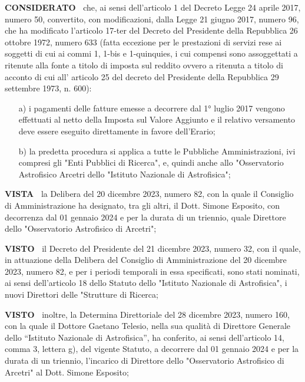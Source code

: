 \documentclass[a4paper,12pt]{letter}
\begin{document}
\textbf{CONSIDERATO~} che, ai sensi dell’articolo 1 del
Decreto Legge 24 aprile 2017, numero 50, convertito, con modificazioni,
dalla Legge 21 giugno 2017, numero 96, che ha modificato l’articolo
17-ter del Decreto del Presidente della Repubblica 26 ottobre 1972, numero
633 (fatta eccezione per le prestazioni di servizi rese ai soggetti di
cui ai commi 1, 1-bis e 1-quinquies, i cui compensi sono assoggettati a
ritenute alla fonte a titolo di imposta sul reddito ovvero a ritenuta a
titolo di acconto di cui all' articolo 25 del decreto del Presidente della
Repubblica 29 settembre 1973, n. 600):

\begin{enumerate}

\item[a)] i pagamenti delle fatture
emesse a decorrere dal 1° luglio 2017 vengono effettuati al netto della
Imposta sul Valore Aggiunto e il relativo versamento deve essere eseguito
direttamente in favore dell’Erario;

\item[b)] la predetta procedura si
applica a tutte le Pubbliche Amministrazioni, ivi compresi gli "Enti
Pubblici di Ricerca", e, quindi anche allo "Osservatorio Astrofisico
Arcetri dello "Istituto Nazionale di Astrofisica";
\end{enumerate}

\textbf{VISTA~}	la Delibera del 20 dicembre 2023, numero 82, con la
quale il Consiglio di Amministrazione ha designato, tra gli altri,
il Dott. Simone Esposito, con decorrenza dal 01 gennaio 2024 e per la
durata di un triennio, quale Direttore dello "Osservatorio Astrofisico
di Arcetri";

\textbf{VISTO~}	il Decreto del Presidente del 21 dicembre 2023,
numero 32, con il quale, in attuazione della Delibera del Consiglio di
Amministrazione del 20 dicembre 2023, numero 82, e per i periodi temporali
in essa specificati, sono stati nominati, ai sensi dell’articolo
18 dello Statuto dello "Istituto Nazionale di Astrofisica", i nuovi
Direttori delle "Strutture di Ricerca;

\textbf{VISTO~}	inoltre, la Determina Direttoriale del 28 dicembre 2023,
numero 160, con la quale il Dottore Gaetano Telesio, nella sua qualità
di Direttore Generale dello ``Istituto Nazionale di Astrofisica'', ha
conferito, ai sensi dell’articolo 14, comma 3, lettera g), del vigente
Statuto, a decorrere dal 01 gennaio 2024 e per la durata di un triennio,
l'incarico di Direttore dello "Osservatorio Astrofisico di Arcetri"
al Dott. Simone Esposito;
   
\end{document}
